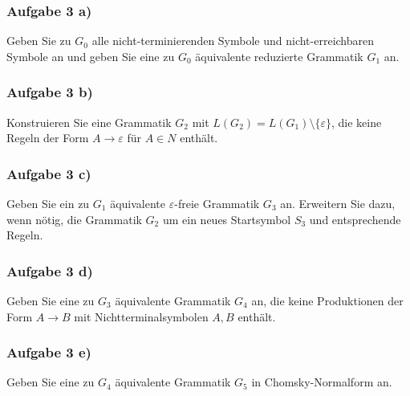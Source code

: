 \subsubsection{Aufgabe 3 a)}
Geben Sie zu $G_0$ alle nicht-terminierenden Symbole und nicht-erreichbaren Symbole an und geben Sie eine zu $G_0$ äquivalente reduzierte Grammatik $G_1$ an.

\begin{lösung}
\end{lösung}

\subsubsection{Aufgabe 3 b)}
Konstruieren Sie eine Grammatik $G_2$ mit $L(G_2)=L(G_1)\setminus\lbrace\varepsilon\rbrace$, die keine Regeln der Form $A\to\varepsilon$ für $A\in N$ enthält.

\begin{lösung}
\end{lösung}

\subsubsection{Aufgabe 3 c)}
Geben Sie ein zu $G_1$ äquivalente $\varepsilon$-freie Grammatik $G_3$ an.
Erweitern Sie dazu, wenn nötig, die Grammatik $G_2$ um ein neues Startsymbol $S_3$ und entsprechende Regeln.

\begin{lösung}
\end{lösung}

\subsubsection{Aufgabe 3 d)}
Geben Sie eine zu $G_3$ äquivalente Grammatik $G_4$ an, die keine Produktionen der Form $A\to B$ mit Nichtterminalsymbolen $A,B$ enthält.

\begin{lösung}
\end{lösung}

\subsubsection{Aufgabe 3 e)}
Geben Sie eine zu $G_4$ äquivalente Grammatik $G_5$ in Chomsky-Normalform an.

\begin{lösung}
\end{lösung}